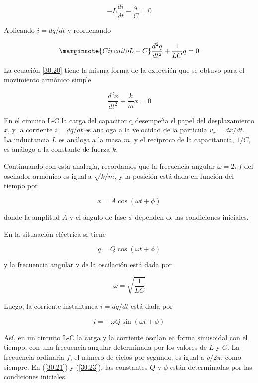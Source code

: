 \begin{equation*}
-L\frac{di}{dt}-\frac{q}{C}=0
\end{equation*}

Aplicando $i=dq/dt$ y reordenando

\begin{equation}\label{30.20}\marginnote{Circuito L-C}
\frac{d^2q}{dt^2}+\frac{1}{LC}q=0
\end{equation}

La ecuación \ref{30.20} tiene la misma forma de la expresión que se obtuvo para el movimiento armónico simple

\begin{equation*}
\frac{d^2x}{dt^2}+\frac{k}{m}x=0
\end{equation*}

En el circuito L-C la carga del capacitor q desempeña el papel del desplazamiento $x$, y la corriente $i=dq/dt$ es análoga a la velocidad de la partícula $v_x=dx/dt$. La inductancia $L$ es análoga a la masa $m$, y el recíproco de la capacitancia, $1/C$, es análogo a la constante de fuerza $k$.

Continuando con esta analogía, recordamos que la frecuencia angular $\omega=2\pi f$ del oscilador armónico es igual a $\sqrt{k/m}$, y la posición está dada en función del tiempo por

\begin{equation*}
x=A\cos (\omega t + \phi)
\end{equation*}

donde la amplitud $A$ y el ángulo de fase $\phi$ dependen de las condiciones iniciales.

En la situaación eléctrica se tiene

\begin{equation}\label{30.21}
q=Q\cos (\omega t +\phi)
\end{equation}

y la frecuencia angular v de la oscilación está dada por

\begin{equation}\label{30.22}
\omega=\sqrt{\frac{1}{LC}}
\end{equation}

Luego, la corriente instantánea $i=dq/dt$ está dada por

\begin{equation}\label{30.23}
i=-\omega Q\sin (\omega t + \phi)
\end{equation}

Así, en un circuito L-C la carga y la corriente oscilan en forma sinusoidal con el tiempo, con una frecuencia angular determinada por los valores de $L$ y $C$. La frecuencia ordinaria $f$, el número de ciclos por segundo, es igual a $v/2\pi$, como siempre. En (\ref{30.21}) y (\ref{30.23}), las constantes $Q$ y $\phi$ están determinadas por las condiciones iniciales.

